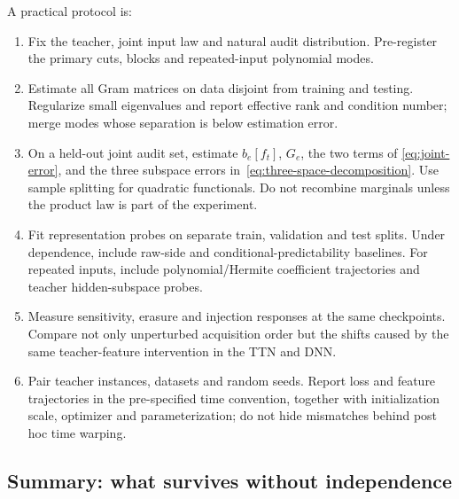 A practical protocol is:
\begin{enumerate}[label=\arabic*.,nosep,leftmargin=*]
\item Fix the teacher, joint input law and natural audit distribution.  Pre-register the primary cuts,
      blocks and repeated-input polynomial modes.
\item Estimate all Gram matrices on data disjoint from training and testing.  Regularize small
      eigenvalues and report effective rank and condition number; merge modes whose separation is
      below estimation error.
\item On a held-out joint audit set, estimate $b_e[f_t]$, $G_e$, the two terms of
      \eqref{eq:joint-error}, and the three subspace errors in~\eqref{eq:three-space-decomposition}.
      Use sample splitting for quadratic functionals.  Do not recombine marginals unless the product
      law is part of the experiment.
\item Fit representation probes on separate train, validation and test splits.  Under dependence,
      include raw-side and conditional-predictability baselines.  For repeated inputs, include
      polynomial/Hermite coefficient trajectories and teacher hidden-subspace probes.
\item Measure sensitivity, erasure and injection responses at the same checkpoints.  Compare not
      only unperturbed acquisition order but the shifts caused by the same teacher-feature
      intervention in the TTN and DNN.
\item Pair teacher instances, datasets and random seeds.  Report loss and feature trajectories in
      the pre-specified time convention, together with initialization scale, optimizer and
      parameterization; do not hide mismatches behind post hoc time warping.
\end{enumerate}

\subsection{Summary: what survives without independence}\label{sec:compare-summary}

